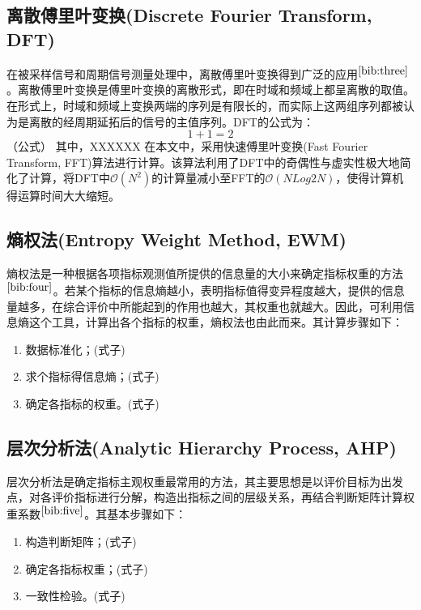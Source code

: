 \documentclass[bwprint]{cumcmthesis}
\begin{document}
        \subsection{离散傅里叶变换(Discrete Fourier Transform, DFT)}
        在被采样信号和周期信号测量处理中，离散傅里叶变换得到广泛的应用$^{\cite{bib:three}}$。离散傅里叶变换是傅里叶变换的离散形式，即在时域和频域上都呈离散的取值。在形式上，时域和频域上变换两端的序列是有限长的，而实际上这两组序列都被认为是离散的经周期延拓后的信号的主值序列。DFT的公式为：
        \begin{equation*}
            1+1=2
        \end{equation*}
        （公式）
        其中，XXXXXX
        在本文中，采用快速傅里叶变换(Fast Fourier Transform, FFT)算法进行计算。该算法利用了DFT中的奇偶性与虚实性极大地简化了计算，将DFT中$\mathcal{O}(N^2)$的计算量减小至FFT的$\mathcal{O}(NLog2N)$，使得计算机得运算时间大大缩短。

        \subsection{熵权法(Entropy Weight Method, EWM)}
        熵权法是一种根据各项指标观测值所提供的信息量的大小来确定指标权重的方法$^{\cite{bib:four}}$。若某个指标的信息熵越小，表明指标值得变异程度越大，提供的信息量越多，在综合评价中所能起到的作用也越大，其权重也就越大。因此，可利用信息熵这个工具，计算出各个指标的权重，熵权法也由此而来。其计算步骤如下：
        \begin{enumerate}
            \item 数据标准化；(式子)
            \item 求个指标得信息熵；(式子)
            \item 确定各指标的权重。(式子)
        \end{enumerate}
        
        \subsection{层次分析法(Analytic Hierarchy Process, AHP)}
        层次分析法是确定指标主观权重最常用的方法，其主要思想是以评价目标为出发点，对各评价指标进行分解，构造出指标之间的层级关系，再结合判断矩阵计算权重系数$^{\cite{bib:five}}$。其基本步骤如下：
        \begin{enumerate}
            \item 构造判断矩阵；(式子)
            \item 确定各指标权重；(式子)
            \item 一致性检验。(式子)
        \end{enumerate}
\end{document}
